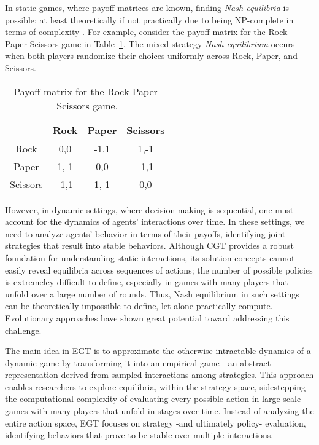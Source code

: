     \noindent
    In static games, where payoff matrices are known, finding \emph{Nash equilibria} is possible; at least theoretically if not practically due to being NP-complete in terms of complexity \cite{10.5555/1714102}. For example, consider the payoff matrix for the Rock-Paper-Scissors game in Table~\ref{tab:rps_payoff}. The mixed-strategy \emph{Nash equilibrium} occurs when both players randomize their choices uniformly across Rock, Paper, and Scissors.
    \begin{table}[H]
        \centering
        \caption{Payoff matrix for the Rock-Paper-Scissors game.}
        \label{tab:rps_payoff}
        \vspace{0.5em}
        \begin{tabular}{c|c c c}
            & Rock & Paper & Scissors \\ \hline
            Rock     & 0,0    & -1,1   & 1,-1 \\
            Paper    & 1,-1   & 0,0    & -1,1 \\
            Scissors & -1,1   & 1,-1   & 0,0 \\
        \end{tabular}
    \end{table}
    
    \noindent
    However, in dynamic settings, where decision making is sequential, one must account for the dynamics of agents' interactions over time. In these settings, we need to analyze agents' behavior in terms of their payoffs, identifying joint strategies that result into stable behaviors. Although CGT provides a robust foundation for understanding static interactions, its solution concepts cannot easily reveal equilibria across sequences of actions; the number of possible policies is extremeley difficult to define, especially in games with many players that unfold over a large number of rounds. Thus, Nash equilibrium in such settings can be theoretically impossible to define, let alone practically compute. Evolutionary approaches have shown great potential toward addressing this challenge.\tinydouble

    \noindent
    The main idea in EGT is to approximate the otherwise intractable dynamics of a dynamic game by transforming it into an empirical game—an abstract representation derived from sampled interactions among strategies. This approach enables researchers to explore equilibria, within the strategy space, sidestepping the computational complexity of evaluating every possible action in large-scale games with many players that unfold in stages over time. Instead of analyzing the entire action space, EGT focuses on strategy -and ultimately policy- evaluation, identifying behaviors that prove to be stable over multiple interactions.
    

